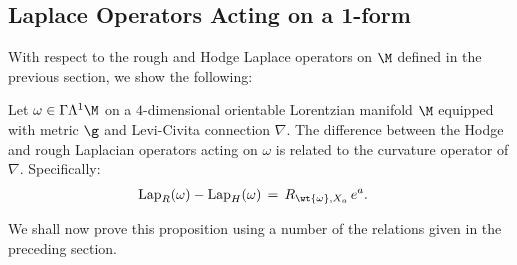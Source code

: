 \documentclass[sections]{tjwNOTES}
\newcommand{\LapH}{\text{Lap}_{H}}
\newcommand{\LapR}{\text{Lap}_{R}}
\begin{document}
\subsection{Laplace Operators Acting on a 1-form}
With respect to the rough and Hodge Laplace operators on $\M$ defined in the previous section, we show the following: \\[0.2cm]

\begin{prop*}{}
	Let $\omega \in \Gamma\Lambda^{1}\M$ on a $4$-dimensional orientable Lorentzian manifold $\M$ equipped with metric $\g$ and Levi-Civita connection $\nabla$. The difference between the Hodge and rough Laplacian operators acting on $\omega$ is related to the curvature operator of $\nabla$. Specifically:
	\begin{align}\label{LapHLapR}
		\LapR(\omega)-\LapH(\omega) &\,=\,  R_{\wt{\omega},X_{a}}\,e^{a}.
	\end{align}
\end{prop*}

We shall now prove this proposition using a number of the relations given in the preceding section. \\
\end{document}
